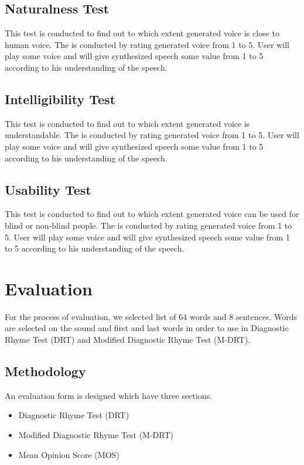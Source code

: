 \subsection{Naturalness Test}
This test is conducted to find out to which extent generated voice is close to human voice. The is conducted by rating generated voice from 1 to 5. User will play some voice and will give synthesized speech some value from 1 to 5 according to his understanding of the speech.

\subsection{Intelligibility Test}
This test is conducted to find out to which extent generated voice is understandable. The is conducted by rating generated voice from 1 to 5. User will play some voice and will give synthesized speech some value from 1 to 5 according to his understanding of the speech.

\subsection{Usability Test}
This test is conducted to find out to which extent generated voice can be used for blind or non-blind people. The is conducted by rating generated voice from 1 to 5. User will play some voice and will give synthesized speech some value from 1 to 5 according to his understanding of the speech.


\section{Evaluation}
For the process of evaluation, we selected list of 64 words and 8 sentences. Words are selected on the sound and first and last words in order to use in Diagnostic Rhyme Test (DRT) and Modified Diagnostic Rhyme Test (M-DRT).

\subsection{Methodology}
An evaluation form is designed which have three sections. 

\begin{itemize}
  \item Diagnostic Rhyme Test (DRT)
  \item Modified Diagnostic Rhyme Test (M-DRT)
  \item Mean Opinion Score (MOS)
\end{itemize}

